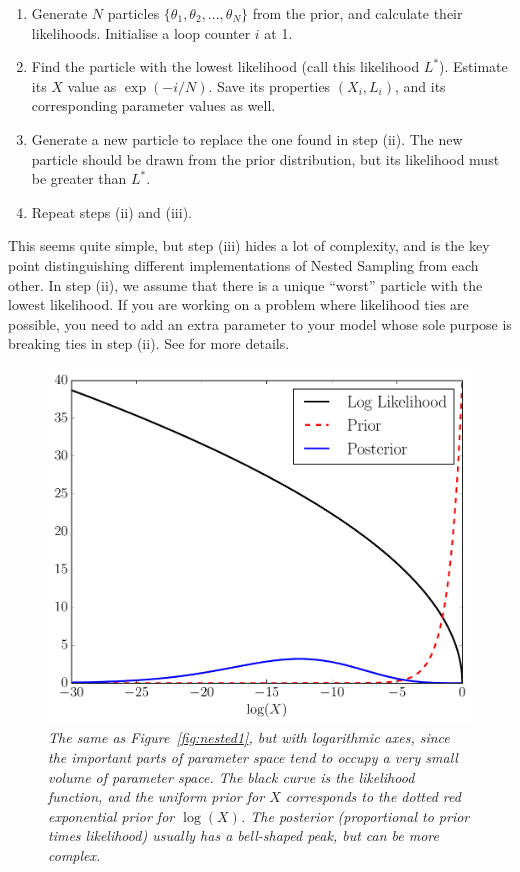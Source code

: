 \begin{enumerate}
\item Generate $N$ particles $\{\theta_1, \theta_2, ..., \theta_N\}$ from
the prior, and calculate their likelihoods. Initialise a loop counter $i$ at
1.
\item Find the particle with the lowest likelihood (call this likelihood $L^*$).
Estimate its $X$ value as
$\exp(-i/N)$. Save its properties $(X_i, L_i)$, and its corresponding
parameter values as well.
\item Generate a new particle to replace the one found in step (ii). The new
particle should be drawn from the prior distribution, but its likelihood
must be greater than $L^*$.
\item Repeat steps (ii) and (iii).
\end{enumerate}

This seems quite simple, but step (iii) hides a lot of complexity, and is the
key point distinguishing different implementations of Nested Sampling from
each other. In step (ii), we assume that there is a unique ``worst'' particle with the
lowest likelihood. If you are working on a problem where likelihood ties are
possible, you need to add an extra parameter to your model whose sole purpose
is breaking ties in step (ii). See \citet{murray} for more details.

\begin{figure}
\begin{center}
\includegraphics[scale=0.45]{nested2.pdf}
\caption{\it The same as Figure~\ref{fig:nested1}, but with logarithmic
axes, since the important parts of parameter space tend to occupy a very
small volume of parameter space. The black curve is the likelihood function,
and the uniform prior for $X$ corresponds to the dotted red exponential prior
for $\log(X)$. The posterior (proportional to prior times likelihood) usually
has a bell-shaped peak, but can be more complex.\label{fig:nested2}}
\end{center}
\end{figure}


